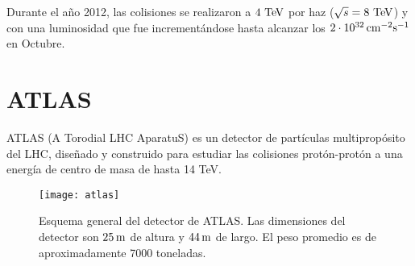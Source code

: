 Durante el año 2012, las colisiones se realizaron a $4\TeV$ por haz ($\sqrt{s} = 8 \TeV$)
y con una luminosidad que fue incrementándose hasta
alcanzar los $\unit[2 \cdot 10^{32}]{cm^{-2}s^{-1}}$ en Octubre. 



\section{ATLAS}

ATLAS (A Torodial LHC AparatuS) es un detector de partículas multipropósito del LHC, diseñado y construido
para estudiar las colisiones protón-protón a una energía de centro de masa de
hasta 14 TeV.




\begin{figure}[!htbp]
  \centering

  \texttt{[image: atlas]}
  \caption{Esquema general del detector de ATLAS. Las dimensiones del detector
  son $\unit[25]{m}$ de altura y $\unit[44]{m}$ de largo. El peso promedio es de aproximadamente 7000 toneladas.}\label{fig:atlas}

\end{figure}

